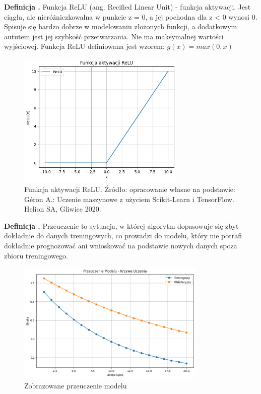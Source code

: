 \noindent
\textbf{Definicja .}
\incrementdefinitionIndex
Funkcja ReLU (ang. Recified Linear Unit) - funkcja aktywacji.
Jest ciągła, ale nieróżniczkowalna w punkcie z = 0, a jej pochodna dla z < 0 wynosi 0.
Spisuje się bardzo dobrze w modelowaniu złożonych funkcji, a dodatkowym aututem jest jej szybkość przetwarzania.
Nie ma maksymalnej wartości wyjściowej.
Funkcja ReLU definiowana jest wzorem:
$g(x) = max(0, x)$

\begin{figure}[ht]
	\centering
	\includegraphics[width=8cm]{resources/machine-learning/images/def_relu.png}
	\caption{Funkcja aktywacji ReLU.
		Źródło: opracowanie własne na podstawie:
        Géron A.: Uczenie maszynowe z użyciem Scikit-Learn i TensorFlow. Helion SA, Gliwice 2020.}
    \label{Fig:def-1}
\end{figure}
\FloatBarrier

\noindent
\textbf{Definicja .}
\incrementdefinitionIndex
Przeuczenie to sytuacja, w której algorytm dopasowuje się zbyt dokładnie do danych treningowych,
co prowadzi do modelu, który nie potrafi dokładnie prognozować ani wnioskować na podstawie nowych danych spoza zbioru treningowego.

\begin{figure}[ht]
	\centering
	\includegraphics[width=9cm]{resources/machine-learning/images/def_overfit.png}
	\caption{Zobrazowane przeuczenie modelu}
    \label{Fig:def-2}
\end{figure}
\FloatBarrier

